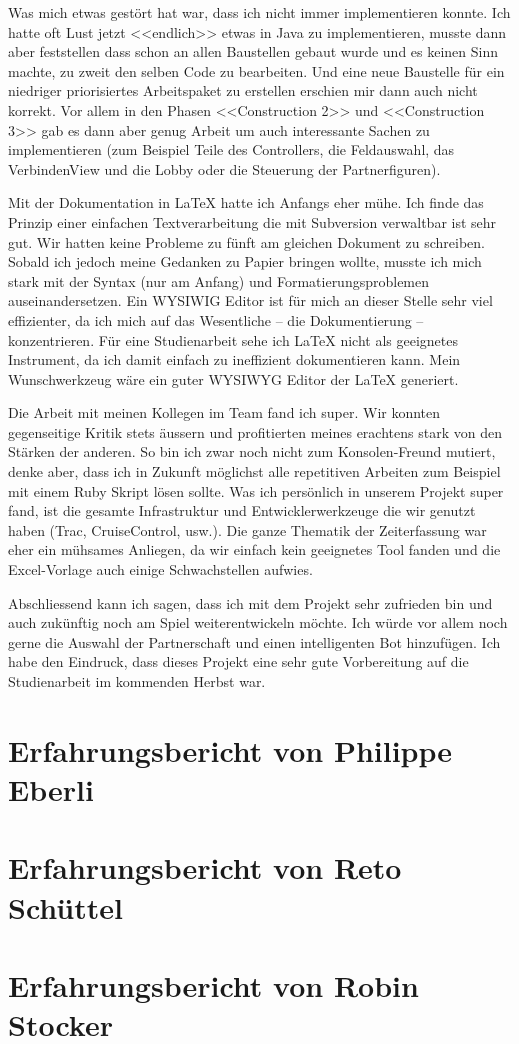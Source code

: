\documentclass[12pt,halfparskip]{scrartcl}
\begin{document}
Was mich etwas gestört hat war, dass ich nicht immer implementieren konnte. Ich hatte oft Lust jetzt <<endlich>> etwas in Java zu implementieren, musste dann aber feststellen dass schon an allen Baustellen gebaut wurde und es keinen Sinn machte, zu zweit den selben Code zu bearbeiten. Und eine neue Baustelle für ein niedriger priorisiertes Arbeitspaket zu erstellen erschien mir dann auch nicht korrekt. Vor allem in den Phasen <<Construction 2>> und <<Construction 3>> gab es dann aber genug Arbeit um auch interessante Sachen zu implementieren (zum Beispiel Teile des Controllers, die Feldauswahl, das VerbindenView und die Lobby oder die Steuerung der Partnerfiguren).

Mit der Dokumentation in LaTeX hatte ich Anfangs eher mühe. Ich finde das Prinzip einer einfachen Textverarbeitung die mit Subversion verwaltbar ist sehr gut. Wir hatten keine Probleme zu fünft am gleichen Dokument zu schreiben. Sobald ich jedoch meine Gedanken zu Papier bringen wollte, musste ich mich stark mit der Syntax (nur am Anfang) und Formatierungsproblemen auseinandersetzen. Ein WYSIWIG Editor ist für mich an dieser Stelle sehr viel effizienter, da ich mich auf das Wesentliche -- die Dokumentierung -- konzentrieren. Für eine Studienarbeit sehe ich LaTeX nicht als geeignetes Instrument, da ich damit einfach zu ineffizient dokumentieren kann. Mein Wunschwerkzeug wäre ein guter WYSIWYG Editor der LaTeX generiert.

Die Arbeit mit meinen Kollegen im Team fand ich super. Wir konnten gegenseitige Kritik stets äussern und profitierten meines erachtens stark von den Stärken der anderen. So bin ich zwar noch nicht zum Konsolen-Freund mutiert, denke aber, dass ich in Zukunft möglichst alle repetitiven Arbeiten zum Beispiel mit einem Ruby Skript lösen sollte. Was ich persönlich in unserem Projekt super fand, ist die gesamte Infrastruktur und Entwicklerwerkzeuge die wir genutzt haben (Trac, CruiseControl, usw.). Die ganze Thematik der Zeiterfassung war eher ein mühsames Anliegen, da wir einfach kein geeignetes Tool fanden und die Excel-Vorlage auch einige Schwachstellen aufwies.
			
Abschliessend kann ich sagen, dass ich mit dem Projekt sehr zufrieden bin und auch zukünftig noch am Spiel weiterentwickeln möchte. Ich würde vor allem noch gerne die Auswahl der Partnerschaft und einen intelligenten Bot hinzufügen. Ich habe den Eindruck, dass dieses Projekt eine sehr gute Vorbereitung auf die Studienarbeit im kommenden Herbst war.

\section{Erfahrungsbericht von Philippe Eberli}

\section{Erfahrungsbericht von Reto Schüttel}

\section{Erfahrungsbericht von Robin Stocker}
\end{document}
